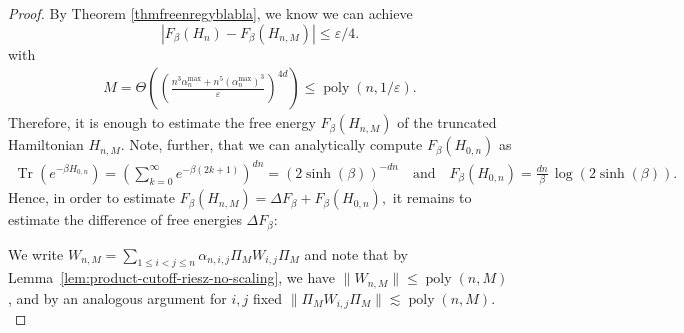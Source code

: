 \documentclass[11pt]{amsart}
\newcommand{\1}{\mathbbm{1}}
\newcommand{\Tr}{\operatorname{Tr}}
\newcommand{\eps}{\varepsilon}
\theoremstyle{plain}
\theoremstyle{definition}
\theoremstyle{remark}
\numberwithin{equation}{section}
\begin{document}
\begin{proof}

By Theorem \ref{thmfreenregyblabla}, we know we can achieve 
\[
|F_\beta(H_n)-F_{\beta}(H_{n,M})|
\le \varepsilon/4.
\]
with \begin{align}
\label{eq:MScalingProooof}
    M = \Theta\left(\left(\frac{n^3\alpha^{\max}_n+n^{5}(\alpha^{\max}_n)^3}{\varepsilon}\right)^{4d}\right)\le \operatorname{poly}(n,1/\eps).
\end{align}
Therefore, it is enough to estimate the free energy $F_\beta(H_{n,M})$ of the truncated Hamiltonian $H_{n,M}$. Note, further, that we can analytically compute $F_\beta(H_{0,n})$ as 
\begin{align*}
\Tr\left(e^{-\beta H_{0,n}}\right) = \left(\sum_{k=0}^\infty e^{-\beta(2k+1)}\right)^{dn}=\left(2\sinh(\beta)\right)^{-dn}\quad\text{and}\quad F_\beta(H_{0,n}) = \frac{dn}{\beta}\,\log\left(2\sinh(\beta)\right).
\end{align*}
Hence, in order to estimate $F_\beta(H_{n,M}) = \Delta F_\beta + F_\beta(H_{0,n}),$ it remains to estimate the difference of free energies $\Delta F_\beta:$

We write $W_{n,M} = \sum_{1\le i<j\le n} \alpha_{n,i,j}\Pi_MW_{i,j} \Pi_M$ and note that by Lemma~\ref{lem:product-cutoff-riesz-no-scaling}, we have $\|W_{n,M}\| \le \operatorname{poly}(n,M)$, and by an analogous argument for $i,j$
fixed $\|\Pi_MW_{i,j}\Pi_M\| \lesssim \operatorname{poly}(n,M).$


\end{proof}
\end{document}
